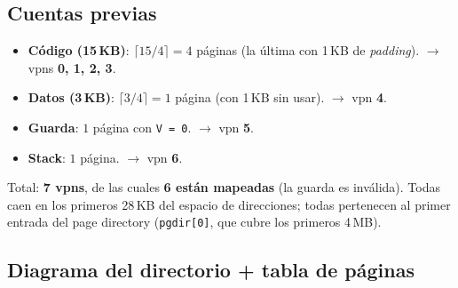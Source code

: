 \documentclass[11pt,a4paper]{article}
\begin{document}
\subsection*{Cuentas previas}

\begin{itemize}[leftmargin=*,nosep]
    \item \textbf{Código (15\,KB)}: $\lceil 15 / 4 \rceil = 4$
        páginas (la última con 1\,KB de \emph{padding}).
        $\to$ vpns \textbf{0, 1, 2, 3}.
    \item \textbf{Datos (3\,KB)}: $\lceil 3 / 4 \rceil = 1$
        página (con 1\,KB sin usar). $\to$ vpn \textbf{4}.
    \item \textbf{Guarda}: $1$ página con \texttt{V = 0}. $\to$ vpn
        \textbf{5}.
    \item \textbf{Stack}: $1$ página. $\to$ vpn \textbf{6}.
\end{itemize}

Total: \textbf{7 vpns}, de las cuales \textbf{6 están mapeadas}
(la guarda es inválida). Todas caen en los primeros 28\,KB del
espacio de direcciones; todas pertenecen al primer entrada del page
directory (\texttt{pgdir[0]}, que cubre los primeros 4\,MB).

\subsection*{Diagrama del directorio + tabla de páginas}
\end{document}
